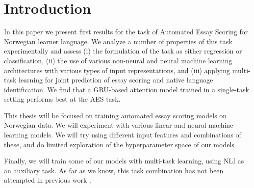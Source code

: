 \chapter{Introduction}

In this paper we present first results for the task of Automated Essay
Scoring for Norwegian learner language. We analyze a number of properties of
this task experimentally and assess (i) the formulation of the task as either
regression or classification, (ii) the use of various non-neural and neural
machine learning architectures with various types of input representations,
and (iii) applying multi-task learning for joint prediction of essay scoring
and native language identification. We find that a GRU-based attention model
trained in a single-task setting performs best at the AES task.

This thesis will be focused on training automated essay scoring models on
Norwegian data. We will experiment with various linear and neural machine
learning models. We will try using different input features and combinations
of these, and do limited exploration of the hyperparameter space of our
models.

Finally, we will train some of our models with multi-task learning, using
\ac{NLI} as an auxiliary task. As far as we know, this task combination has
not been attempted in previous work .
